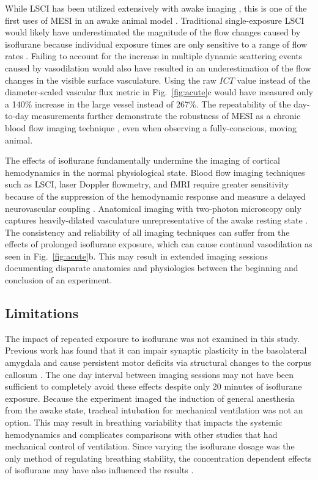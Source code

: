 \documentclass[12pt]{spieman}
\begin{document}
\begin{spacing}{2}
While LSCI has been utilized extensively with awake imaging \cite{Takuwa:2011jr,Seto:2014ga,Lu:2017bo,Balbi:2017cj,Sunil:2020ac}, this is one of the first uses of MESI in an awake animal model \cite{He:2020}. Traditional single-exposure LSCI would likely have underestimated the magnitude of the flow changes caused by isoflurane because individual exposure times are only sensitive to a range of flow rates \cite{Parthasarathy:2008el}. Failing to account for the increase in multiple dynamic scattering events caused by vasodilation would also have resulted in an underestimation of the flow changes in the visible surface vasculature. Using the raw $ICT$ value instead of the diameter-scaled vascular flux metric in Fig.~\ref{fig:acute}c would have measured only a 140\% increase in the large vessel instead of 267\%. The repeatability of the day-to-day measurements further demonstrate the robustness of MESI as a chronic blood flow imaging technique \cite{Kazmi:2013hp}, even when observing a fully-conscious, moving animal.

The effects of isoflurane fundamentally undermine the imaging of cortical hemodynamics in the normal physiological state. Blood flow imaging techniques such as LSCI, laser Doppler flowmetry, and fMRI require greater sensitivity because of the suppression of the hemodynamic response \cite{Takuwa:2012ee} and measure a delayed neurovascular coupling \cite{Pisauro:2013cx}. Anatomical imaging with two-photon microscopy only captures heavily-dilated vasculature unrepresentative of the awake resting state \cite{Lyons:2016bd}. The consistency and reliability of all imaging techniques can suffer from the effects of prolonged isoflurane exposure, which can cause continual vasodilation as seen in Fig.~\ref{fig:acute}b. This may result in extended imaging sessions documenting disparate anatomies and physiologies between the beginning and conclusion of an experiment.



\subsection{Limitations}

The impact of repeated exposure to isoflurane was not examined in this study. Previous work has found that it can impair synaptic plasticity in the basolateral amygdala \cite{Long:2016ri} and cause persistent motor deficits via structural changes to the corpus callosum \cite{Bajwa:2018ri}. The one day interval between imaging sessions may not have been sufficient to completely avoid these effects despite only 20 minutes of isoflurane exposure. Because the experiment imaged the induction of general anesthesia from the awake state, tracheal intubation for mechanical ventilation was not an option. This may result in breathing variability that impacts the systemic hemodynamics and complicates comparisons with other studies that had mechanical control of ventilation. Since varying the isoflurane dosage was the only method of regulating breathing stability, the concentration dependent effects of isoflurane may have also influenced the results \cite{Masamoto:2009dd,Li:2014eh}.


\end{spacing}
\end{document}

